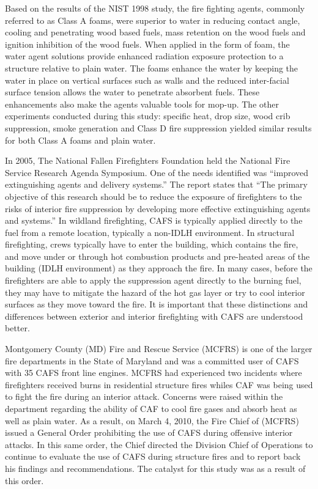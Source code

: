 \documentclass[12pt,oneside]{book}
\begin{document}
Based on the results of the NIST 1998 study, the fire fighting agents, commonly referred to as Class A foams, were superior to water in reducing contact angle, cooling and penetrating wood based fuels, mass retention on the wood fuels and ignition inhibition of the wood fuels.  When applied in the form of foam, the water agent solutions provide enhanced radiation exposure protection to a structure relative to plain water.  The foams enhance the water by keeping the water in place on vertical surfaces such as walls and the reduced inter-facial surface tension allows the water to penetrate absorbent fuels.  These enhancements also make the agents valuable tools for mop-up. The other experiments conducted during this study: specific heat, drop size, wood crib suppression, smoke generation and Class D fire suppression yielded similar results for both Class A foams and plain water.

In 2005, The National Fallen Firefighters Foundation held the National Fire Service Research Agenda Symposium.  One of the needs identified was ``improved extinguishing agents and delivery systems.'' The report states that ``The primary objective of this research should be to reduce the exposure of firefighters to the risks of interior fire suppression by developing more effective extinguishing agents and systems.'' In wildland firefighting, CAFS is typically applied directly to the fuel from a remote location, typically a non-IDLH environment. In structural firefighting, crews typically  have to enter the building, which contains the fire, and move under or through hot combustion products and pre-heated areas of the building (IDLH environment) as they approach the fire. In many cases, before the firefighters are able to apply the suppression agent directly to the burning fuel, they may have to mitigate the hazard of the hot gas layer or try to cool interior surfaces as they move toward the fire. It is important that these distinctions and differences between exterior and interior firefighting with CAFS are understood better.

Montgomery County (MD) Fire and Rescue Service (MCFRS) is one of the larger fire departments in the State of Maryland and was a committed user of CAFS with 35 CAFS front line engines. MCFRS had experienced two incidents where firefighters received burns in residential structure fires whiles CAF was being used to fight the fire during an interior attack. Concerns were raised within the department regarding the ability of CAF to cool fire gases and absorb heat as well as plain water. As a result, on March 4, 2010, the Fire Chief of (MCFRS) issued a General Order prohibiting the use of CAFS during offensive interior attacks. In this same order, the Chief directed the Division Chief of Operations to continue to evaluate the use of CAFS during structure fires and to report back his findings and recommendations. The catalyst for this study was as a result of this order.
\end{document}
